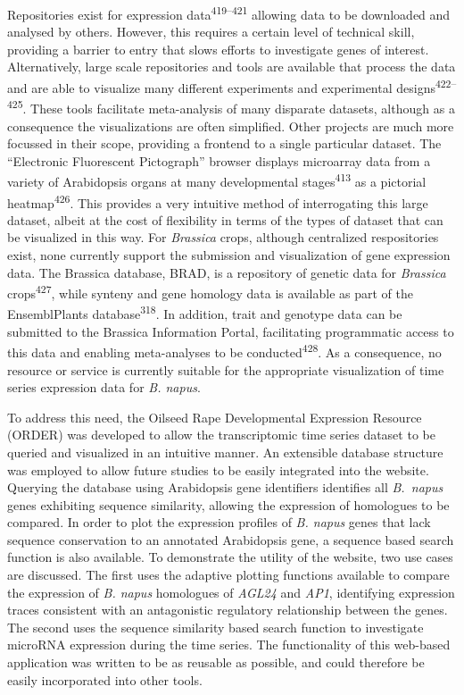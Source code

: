 \documentclass[12pt,]{book}
\begin{document}
Repositories exist for expression data\textsuperscript{419--421}
allowing data to be downloaded and analysed by others. However, this
requires a certain level of technical skill, providing a barrier to
entry that slows efforts to investigate genes of interest.
Alternatively, large scale repositories and tools are available that
process the data and are able to visualize many different experiments
and experimental designs\textsuperscript{422--425}. These tools
facilitate meta-analysis of many disparate datasets, although as a
consequence the visualizations are often simplified. Other projects are
much more focussed in their scope, providing a frontend to a single
particular dataset. The ``Electronic Fluorescent Pictograph'' browser
displays microarray data from a variety of Arabidopsis organs at many
developmental stages\textsuperscript{413} as a pictorial
heatmap\textsuperscript{426}. This provides a very intuitive method of
interrogating this large dataset, albeit at the cost of flexibility in
terms of the types of dataset that can be visualized in this way. For
\emph{Brassica} crops, although centralized respositories exist, none
currently support the submission and visualization of gene expression
data. The Brassica database, BRAD, is a repository of genetic data for
\emph{Brassica} crops\textsuperscript{427}, while synteny and gene
homology data is available as part of the EnsemblPlants
database\textsuperscript{318}. In addition, trait and genotype data can
be submitted to the Brassica Information Portal, facilitating
programmatic access to this data and enabling meta-analyses to be
conducted\textsuperscript{428}. As a consequence, no resource or service
is currently suitable for the appropriate visualization of time series
expression data for \emph{B. napus}.

To address this need, the Oilseed Rape Developmental Expression Resource
(ORDER) was developed to allow the transcriptomic time series dataset to
be queried and visualized in an intuitive manner. An extensible database
structure was employed to allow future studies to be easily integrated
into the website. Querying the database using Arabidopsis gene
identifiers identifies all \emph{B.~napus} genes exhibiting sequence
similarity, allowing the expression of homologues to be compared. In
order to plot the expression profiles of \emph{B. napus} genes that lack
sequence conservation to an annotated Arabidopsis gene, a sequence based
search function is also available. To demonstrate the utility of the
website, two use cases are discussed. The first uses the adaptive
plotting functions available to compare the expression of \emph{B.
napus} homologues of \emph{AGL24} and \emph{AP1}, identifying expression
traces consistent with an antagonistic regulatory relationship between
the genes. The second uses the sequence similarity based search function
to investigate microRNA expression during the time series. The
functionality of this web-based application was written to be as
reusable as possible, and could therefore be easily incorporated into
other tools.
\end{document}
